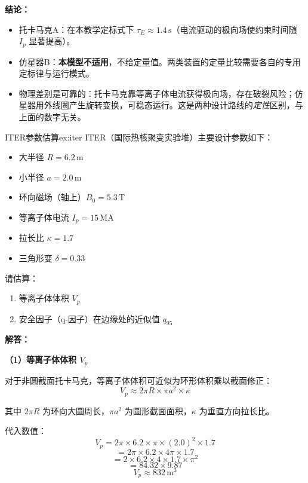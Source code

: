 \textbf{结论：}
\begin{itemize}
    \item 托卡马克A：在本教学定标式下 $\tau_E \approx 1.4\,\mathrm{s}$（电流驱动的极向场使约束时间随 $I_p$ 显著提高）。
    \item 仿星器B：\textbf{本模型不适用}，不给定量值。两类装置的定量比较需要各自的专用定标律与运行模式。
    \item 物理差别是可靠的：托卡马克靠等离子体电流获得极向场，存在破裂风险；仿星器用外线圈产生旋转变换，可稳态运行。这是两种设计路线的\emph{定性}区别，与上面的数字无关。
\end{itemize}


\begin{example}{ITER参数估算}{ex:iter}
ITER（国际热核聚变实验堆）主要设计参数如下：
\begin{itemize}
    \item 大半径 $R=6.2\,\mathrm{m}$
    \item 小半径 $a=2.0\,\mathrm{m}$
    \item 环向磁场（轴上）$B_0=5.3\,\mathrm{T}$
    \item 等离子体电流 $I_p=15\,\mathrm{MA}$
    \item 拉长比 $\kappa = 1.7$
    \item 三角形变 $\delta = 0.33$
\end{itemize}
请估算：
\begin{enumerate}
    \item 等离子体体积 $V_p$
    \item 安全因子（q-因子）在边缘处的近似值 $q_{95}$
\end{enumerate}
\end{example}

\textbf{解答：}

\textbf{（1）等离子体体积 $V_p$}

对于非圆截面托卡马克，等离子体体积可近似为环形体积乘以截面修正：
\begin{equation}
    V_p \approx 2\pi R \times \pi a^2 \times \kappa
\label{eq:ch10-tokamak-volume}
\end{equation}

其中 $2\pi R$ 为环向大圆周长，$\pi a^2$ 为圆形截面面积，$\kappa$ 为垂直方向拉长比。

代入数值：
\[
    V_p = 2\pi \times 6.2 \times \pi \times (2.0)^2 \times 1.7
\]
\[
    = 2\pi \times 6.2 \times 4\pi \times 1.7
\]
\[
    = 2 \times 6.2 \times 4 \times 1.7 \times \pi^2
\]
\[
    = 84.32 \times 9.87
\]
\[
    \boxed{V_p \approx 832\,\mathrm{m^3}}
\]

